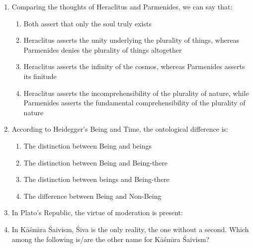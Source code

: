 \documentclass[12pt]{article}
\theoremstyle{remark}
\begin{document}
\begin{enumerate}
\hfill{}
\item Comparing the thoughts of Heraclitus and Parmenides, we can say that:
\begin{enumerate}
    \item Both assert that only the soul  truly exists
    \item Heraclitus asserts the unity underlying the plurality of things, whereas Parmenides denies the plurality of things altogether
    \item Heraclitus asserts the infinity of the cosmos, whereas Parmenides asserts its finitude
    \item Heraclitus asserts the incomprehensibility of the plurality of nature, while Parmenides asserts the fundamental comprehensibility of the plurality of nature
\end{enumerate}
\hfill{}
\item According to Heidegger’s Being and Time, the ontological difference is:
\begin{enumerate}
    \item The distinction between Being  and beings 
    \item The distinction between Being  and Being-there 
    \item The distinction between beings  and Being-there 
    \item The difference between Being  and Non-Being 
\end{enumerate}
\hfill{}
\item In Plato’s Republic, the virtue of moderation is present:
\begin{enumerate}
\end{enumerate}
\hfill{}
\item In K\={a}\'{s}m\={\i}ra \'{S}aivism, \'{S}iva is the only reality, the one without a second. Which among the following is/are the other name for K\={a}\'{s}m\={\i}ra \'{S}aivism?

\end{enumerate}
\end{document}
